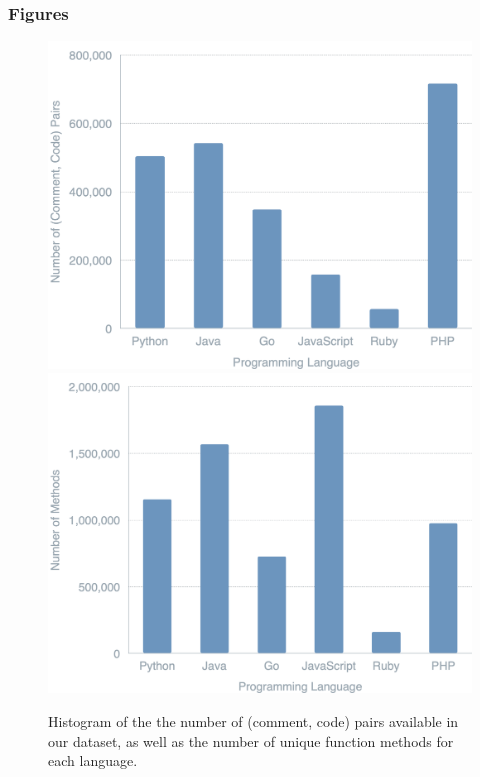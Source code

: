 \documentclass[10pt,twocolumn]{article}
\begin{document}
\subsubsection{Figures}
\begin{figure}[!ht]
    \centering
    \includegraphics[scale=0.1]{figures/data_analysis/dist2.png}
    \includegraphics[scale=0.1]{figures/data_analysis/dists3.png}
    \caption{Histogram of the the number of (comment, code) pairs available in our dataset, as well as the number of unique function methods for each language.}
    \label{fig:dist_methods}
\end{figure}
\end{document}
